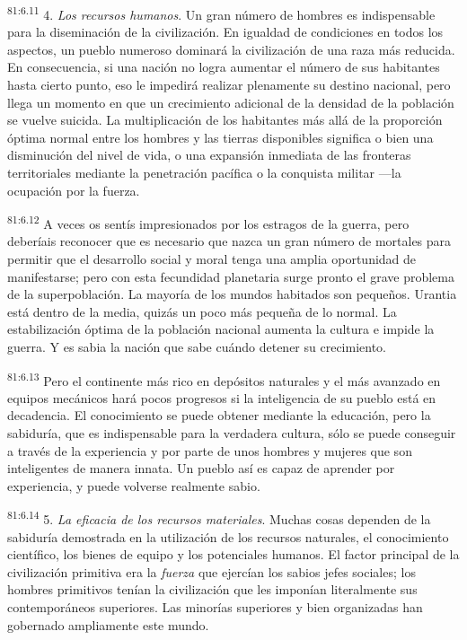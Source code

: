 \documentclass[twoside, 11pt]{book}
\begin{document}
\par
\textsuperscript{81:6.11} 4. \textit{Los recursos humanos}. Un gran número de hombres es indispensable para la diseminación de la civilización. En igualdad de condiciones en todos los aspectos, un pueblo numeroso dominará la civilización de una raza más reducida. En consecuencia, si una nación no logra aumentar el número de sus habitantes hasta cierto punto, eso le impedirá realizar plenamente su destino nacional, pero llega un momento en que un crecimiento adicional de la densidad de la población se vuelve suicida. La multiplicación de los habitantes más allá de la proporción óptima normal entre los hombres y las tierras disponibles significa o bien una disminución del nivel de vida, o una expansión inmediata de las fronteras territoriales mediante la penetración pacífica o la conquista militar ---la ocupación por la fuerza.

\par
\textsuperscript{81:6.12} A veces os sentís impresionados por los estragos de la guerra, pero deberíais reconocer que es necesario que nazca un gran número de mortales para permitir que el desarrollo social y moral tenga una amplia oportunidad de manifestarse; pero con esta fecundidad planetaria surge pronto el grave problema de la superpoblación. La mayoría de los mundos habitados son pequeños. Urantia está dentro de la media, quizás un poco más pequeña de lo normal. La estabilización óptima de la población nacional aumenta la cultura e impide la guerra. Y es sabia la nación que sabe cuándo detener su crecimiento.

\par
\textsuperscript{81:6.13} Pero el continente más rico en depósitos naturales y el más avanzado en equipos mecánicos hará pocos progresos si la inteligencia de su pueblo está en decadencia. El conocimiento se puede obtener mediante la educación, pero la sabiduría, que es indispensable para la verdadera cultura, sólo se puede conseguir a través de la experiencia y por parte de unos hombres y mujeres que son inteligentes de manera innata. Un pueblo así es capaz de aprender por experiencia, y puede volverse realmente sabio.

\par
\textsuperscript{81:6.14} 5. \textit{La eficacia de los recursos materiales}. Muchas cosas dependen de la sabiduría demostrada en la utilización de los recursos naturales, el conocimiento científico, los bienes de equipo y los potenciales humanos. El factor principal de la civilización primitiva era la \textit{fuerza} que ejercían los sabios jefes sociales; los hombres primitivos tenían la civilización que les imponían literalmente sus contemporáneos superiores. Las minorías superiores y bien organizadas han gobernado ampliamente este mundo.
\end{document}
